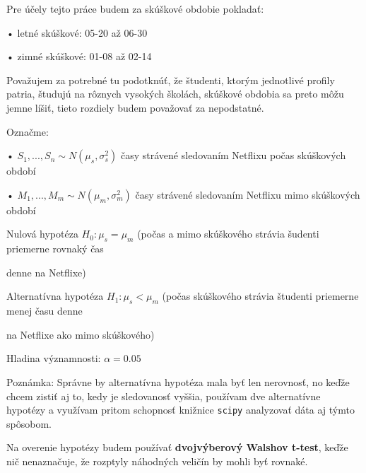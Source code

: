 \documentclass[10pt,a4paper]{article}
\begin{document}
\vspace{2mm}
Pre účely tejto práce budem za skúškové obdobie pokladať:

\hspace{3mm} • letné skúškové: 05-20 až 06-30

\hspace{3mm} • zimné skúškové: 01-08 až 02-14

Považujem za potrebné tu podotknúť, že študenti, ktorým jednotlivé profily patria, študujú na rôznych vysokých školách, skúškové obdobia sa preto môžu jemne líšiť, tieto rozdiely budem považovať za nepodstatné.

\vspace{2mm}
Označme:

\hspace{3mm} • $S_1,...,S_n \sim N(\mu_s, \sigma_s^2)$ časy strávené sledovaním Netflixu počas skúškových období

\hspace{3mm} • $M_1,...,M_m \sim N(\mu_m, \sigma_m^2)$ časy strávené sledovaním Netflixu mimo skúškových období

\vspace{2mm}
Nulová hypotéza $H_0: \mu_s = \mu_m$ (počas a mimo skúškového strávia šudenti priemerne rovnaký čas

\hspace{5.2cm}denne na Netflixe)

Alternatívna hypotéza $H_1: \mu_s < \mu_m$ (počas skúškového strávia študenti priemerne menej času denne

\hspace{6.1cm}na Netflixe ako mimo skúškového)



Hladina významnosti: $\alpha = 0.05$

\begin{small}
Poznámka: Správne by alternatívna hypotéza mala byť len nerovnosť, no keďže chcem zistiť aj to, kedy je sledovanosť vyššia, používam dve alternatívne hypotézy a využívam pritom schopnosť knižnice \verb|scipy| analyzovať dáta aj týmto spôsobom.
\end{small}

\vspace{2mm}
Na overenie hypotézy budem používať \textbf{dvojvýberový Walshov t-test}, keďže nič nenaznačuje, že rozptyly náhodných veličín by mohli byť rovnaké.
\end{document}

